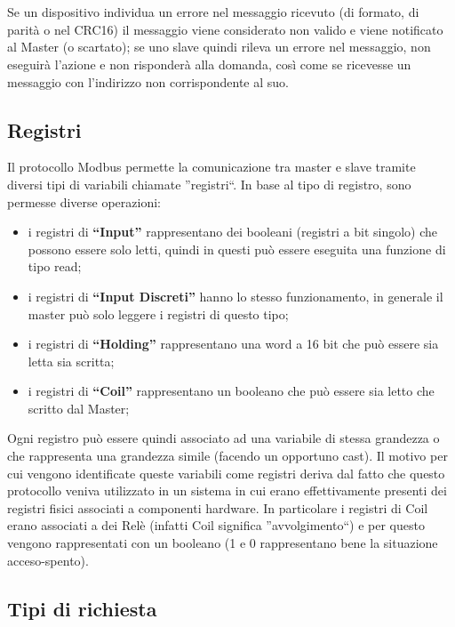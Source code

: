 \documentclass[a4paper,titlepage]{book}
\begin{document}
~

~

Se un dispositivo individua un errore nel messaggio ricevuto (di formato, di parità o nel CRC16) il messaggio viene considerato non valido e viene notificato al Master (o scartato); se uno slave quindi rileva un errore nel messaggio, non eseguirà l'azione e non risponderà alla domanda, così come se ricevesse un messaggio con l'indirizzo non corrispondente al suo.


\subsection{Registri}

Il protocollo Modbus permette la comunicazione tra master e slave tramite diversi tipi di variabili chiamate ''registri``. In base al tipo di registro, sono permesse diverse operazioni:

\begin{itemize}[noitemsep,topsep=15pt,parsep=10pt,partopsep=0pt]

\item i registri di \textbf{``Input''} rappresentano dei booleani (registri a bit singolo) che possono essere solo letti, quindi in questi può essere eseguita una funzione di tipo read;
\item i registri di \textbf{``Input Discreti''} hanno lo stesso funzionamento, in generale il master può solo leggere i registri di questo tipo;
\item i registri di \textbf{``Holding''} rappresentano una word a 16 bit che può essere sia letta sia scritta;
\item i registri di \textbf{``Coil''} rappresentano un booleano che può essere sia letto che scritto dal Master;

\end{itemize}

Ogni registro può essere quindi associato ad una variabile di stessa grandezza o che rappresenta una grandezza simile (facendo un opportuno cast). Il motivo per cui vengono identificate queste variabili come registri deriva dal fatto che questo protocollo veniva utilizzato in un sistema in cui erano effettivamente presenti dei registri fisici associati a componenti hardware. In particolare i registri di Coil erano associati a dei Relè (infatti Coil significa ''avvolgimento``) e per questo vengono rappresentati con un booleano (1 e 0 rappresentano bene la situazione acceso-spento).

\subsection{Tipi di richiesta}
\end{document}

